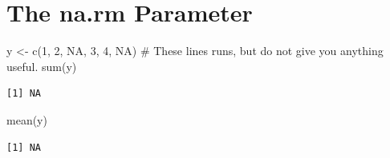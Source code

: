 \documentclass[
  letterpaper,
  DIV=11,
  numbers=noendperiod]{scrreprt}
\newenvironment{Shaded}{\begin{snugshade}}{\end{snugshade}}
\newcommand{\CommentTok}[1]{\textcolor[rgb]{0.37,0.37,0.37}{#1}}
\newcommand{\ConstantTok}[1]{\textcolor[rgb]{0.56,0.35,0.01}{#1}}
\newcommand{\DecValTok}[1]{\textcolor[rgb]{0.68,0.00,0.00}{#1}}
\newcommand{\FunctionTok}[1]{\textcolor[rgb]{0.28,0.35,0.67}{#1}}
\newcommand{\NormalTok}[1]{\textcolor[rgb]{0.00,0.23,0.31}{#1}}
\newcommand{\OtherTok}[1]{\textcolor[rgb]{0.00,0.23,0.31}{#1}}
\begin{document}
\section{The na.rm Parameter}\label{the-na.rm-parameter}

\begin{Shaded}
\begin{Highlighting}[]
\NormalTok{y }\OtherTok{\textless{}{-}} \FunctionTok{c}\NormalTok{(}\DecValTok{1}\NormalTok{, }\DecValTok{2}\NormalTok{, }\ConstantTok{NA}\NormalTok{, }\DecValTok{3}\NormalTok{, }\DecValTok{4}\NormalTok{, }\ConstantTok{NA}\NormalTok{)}
\CommentTok{\# These lines runs, but do not give you anything useful.}
\FunctionTok{sum}\NormalTok{(y)}
\end{Highlighting}
\end{Shaded}

\begin{verbatim}
[1] NA
\end{verbatim}

\begin{Shaded}
\begin{Highlighting}[]
\FunctionTok{mean}\NormalTok{(y)}
\end{Highlighting}
\end{Shaded}

\begin{verbatim}
[1] NA
\end{verbatim}
\end{document}
